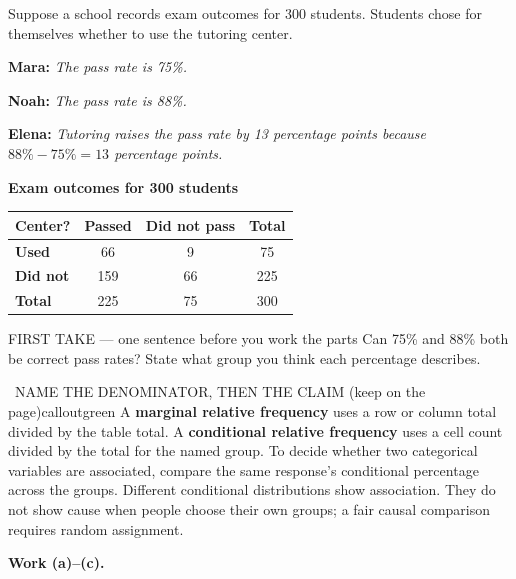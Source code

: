 \documentclass[11pt]{article}
\begin{document}


Suppose a school records exam outcomes for 300 students. Students chose for themselves whether to use the tutoring center.\par\smallskip \textbf{Mara:} \emph{The pass rate is 75\%.}\par \textbf{Noah:} \emph{The pass rate is 88\%.}\par \textbf{Elena:} \emph{Tutoring raises the pass rate by 13 percentage points because $88\%-75\%=13$ percentage points.}\par
\begin{center}
\textbf{Exam outcomes for 300 students}\par\smallskip
\begin{tabular}{|l|c|c|c|}
\hline
\textbf{Center?} & \textbf{Passed} & \textbf{Did not pass} & \textbf{Total} \\ \hline
\textbf{Used} & 66 & 9 & 75 \\ \hline
\textbf{Did not} & 159 & 66 & 225 \\ \hline
\textbf{Total} & 225 & 75 & 300 \\ \hline
\end{tabular}
\end{center}
\begin{firsttakebox}{FIRST TAKE --- one sentence before you work the parts}
Can 75\% and 88\% both be correct pass rates? State what group you think each percentage describes.
\workspace{0.9in}
\end{firsttakebox}

\begin{callout}{\IconBook\ NAME THE DENOMINATOR, THEN THE CLAIM (keep on the page)}{calloutgreen}
A \textbf{marginal relative frequency} uses a row or column total divided by the table total. A
\textbf{conditional relative frequency} uses a cell count divided by the total for the named group.
To decide whether two categorical variables are associated, compare the same response's conditional
percentage across the groups. Different conditional distributions show association. They do not show cause
when people choose their own groups; a fair causal comparison requires random assignment.
\end{callout}

\newpage
\textbf{Work (a)--(c).}\par\smallskip
\end{document}
